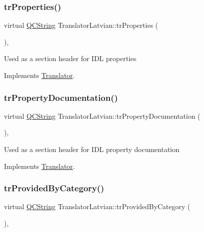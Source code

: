\subsubsection{\texorpdfstring{trProperties()}{trProperties()}}
{\footnotesize\ttfamily virtual \mbox{\hyperlink{class_q_c_string}{Q\+C\+String}} Translator\+Latvian\+::tr\+Properties (\begin{DoxyParamCaption}{ }\end{DoxyParamCaption})\hspace{0.3cm}{\ttfamily [inline]}, {\ttfamily [virtual]}}

Used as a section header for I\+DL properties 

Implements \mbox{\hyperlink{class_translator}{Translator}}.

\mbox{\label{class_translator_latvian_acf1d81d6a8a713daaa428e4155c185d8}} 
\subsubsection{\texorpdfstring{trPropertyDocumentation()}{trPropertyDocumentation()}}
{\footnotesize\ttfamily virtual \mbox{\hyperlink{class_q_c_string}{Q\+C\+String}} Translator\+Latvian\+::tr\+Property\+Documentation (\begin{DoxyParamCaption}{ }\end{DoxyParamCaption})\hspace{0.3cm}{\ttfamily [inline]}, {\ttfamily [virtual]}}

Used as a section header for I\+DL property documentation 

Implements \mbox{\hyperlink{class_translator}{Translator}}.

\mbox{\label{class_translator_latvian_ab3fd6b93bf152fcd134ae2f657d81dec}} 
\subsubsection{\texorpdfstring{trProvidedByCategory()}{trProvidedByCategory()}}
{\footnotesize\ttfamily virtual \mbox{\hyperlink{class_q_c_string}{Q\+C\+String}} Translator\+Latvian\+::tr\+Provided\+By\+Category (\begin{DoxyParamCaption}{ }\end{DoxyParamCaption})\hspace{0.3cm}{\ttfamily [inline]}, {\ttfamily [virtual]}}

